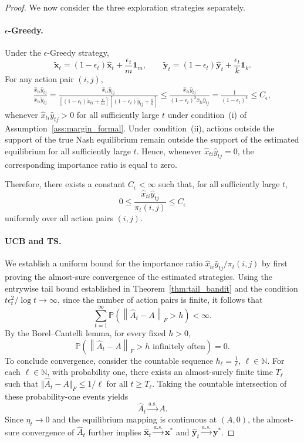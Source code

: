 \documentclass[12pt]{article}
\begin{document}
\begin{proof}
We now consider the three exploration strategies separately. 
\paragraph{$\epsilon$-Greedy.} 
Under the $\epsilon$-Greedy strategy, 
\[ \widetilde{\bm x}_t = (1-\epsilon_t)\widehat{\bm x}_t + \frac{\epsilon_t}{m}\bm 1_m, \qquad \widetilde{\bm y}_t = (1-\epsilon_t)\widehat{\bm y}_t + \frac{\epsilon_t}{k}\bm 1_k. \] 
For any action pair $(i,j)$, 
\begin{align*} 
\frac{ \widehat{x}_{ti}\widehat{y}_{tj} }{ \widetilde{x}_{ti}\widetilde{y}_{tj} } = \frac{ \widehat{x}_{ti}\widehat{y}_{tj} }{\left[(1-\epsilon_t)\widetilde{x}_{ti}+\frac{\epsilon}{m}\right] \left[(1-\epsilon_t)\widetilde{y}_{tj}+\frac{\epsilon}{k}\right]} \le \frac{ \widehat{x}_{ti}\widehat{y}_{tj} }{ (1-\epsilon_t)^2 \widehat{x}_{ti}\widehat{y}_{tj} } = \frac{1}{(1-\epsilon_t)^2} \le C_\epsilon, 
\end{align*} 
whenever $\widehat{x}_{ti}\widehat{y}_{tj}>0$ for all sufficiently large $t$ under condition~\textnormal{(i)} of Assumption~\ref{ass:margin_formal}. Under condition~\textnormal{(ii)}, actions outside the support of the true Nash equilibrium remain outside the support of the estimated equilibrium for all sufficiently large $t$. Hence, whenever $\widehat{x}_{ti}\widehat{y}_{tj}=0$, the corresponding importance ratio is equal to zero.

Therefore, there exists a constant $C_\epsilon<\infty$ such that, for all sufficiently large $t$, \[ 0 \le \frac{ \widehat{x}_{ti}\widehat{y}_{tj} }{ \pi_t(i,j) } \le C_\epsilon \] uniformly over all action pairs $(i,j)$.

\paragraph{UCB and TS.} 
We establish a uniform bound for the importance ratio $\widehat{x}_{ti}\widehat{y}_{tj}/\pi_t(i,j)$ by first proving the almost-sure convergence of the estimated strategies.
Using the entrywise tail bound established in Theorem~\ref{thm:tail_bandit} and the condition $t\epsilon_t^2/{\log t} \to \infty$, since the number of action pairs is finite, it follows that
\[
\sum_{t=1}^{\infty}
\mathbb P\left(
\left\|
\widehat A_t-A
\right\|_F
>
h
\right)
<
\infty.
\]
By the Borel--Cantelli lemma, for every fixed $h>0$,
\[
\mathbb P\left(
\left\|
\widehat A_t-A
\right\|_F
>
h
\text{ infinitely often}
\right)
=
0.
\]
To conclude convergence, consider the countable sequence $h_\ell = \frac{1}{\ell}$, $\ell\in\mathbb N$. For each $\ell\in\mathbb N$, with probability one, there exists an almost-surely finite time $T_\ell$ such that $\Vert \widehat A_t-A \Vert_F \le {1}/{\ell}$
for all $t\ge T_\ell$. Taking the countable intersection of these probability-one events yields
\[
\widehat A_t
\stackrel{\mathrm{a.s.}}{\to}
A.
\]
Since $\eta_t\to0$ and the equilibrium mapping is continuous at $(A,0)$, the almost-sure convergence of $\widehat A_t$ further implies $\widehat{\bm x}_t \stackrel{a.s.}{\to} \bm x^\ast$ and $\widehat{\bm y}_t \stackrel{a.s.}{\to} \bm y^\ast$.


\end{proof}
\end{document}
